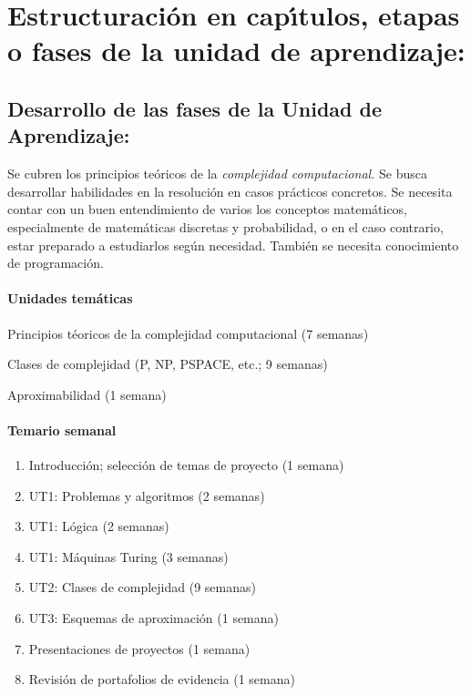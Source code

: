 \section{Estructuraci\'{o}n en cap\'{\i}tulos, etapas o fases de la unidad de
  aprendizaje:}
\subsection{Desarrollo de las fases de la Unidad de Aprendizaje:}

\quad

Se cubren los principios te\'{o}ricos de la {\em complejidad
  computacional.} Se busca desarrollar habilidades en la
resoluci\'{o}n en casos pr\'{a}cticos concretos. Se necesita contar
con un buen entendimiento de varios los conceptos matem\'{a}ticos,
especialmente de matem\'{a}ticas discretas y probabilidad, o en el
caso contrario, estar preparado a estudiarlos seg\'{u}n
necesidad. Tambi\'{e}n se necesita conocimiento de programaci\'{o}n.

\paragraph{Unidades tem\'{a}ticas}

\begin{description}[itemsep=-2pt]
\item[UT1] Principios t\'{e}oricos de la complejidad computacional (7 semanas)
\item[UT2] Clases de complejidad (P, NP, PSPACE, etc.; 9 semanas)
\item[UT3] Aproximabilidad (1 semana)
\end{description}

\paragraph{Temario semanal}

\quad



\begin{enumerate}[itemsep=-3pt]
\item{Introducci\'{o}n; selecci\'{o}n de temas de proyecto (1 semana)}
\item{UT1: Problemas y algoritmos (2 semanas)}
\item{UT1: L\'{o}gica (2 semanas)}
\item{UT1: M\'{a}quinas Turing (3 semanas)}
\item{UT2: Clases de complejidad (9 semanas)}
\item{UT3: Esquemas de aproximaci\'{o}n (1 semana)}
\item{Presentaciones de proyectos (1 semana)}
\item{Revisi\'{o}n de portafolios de evidencia (1 semana)}
\end{enumerate}

